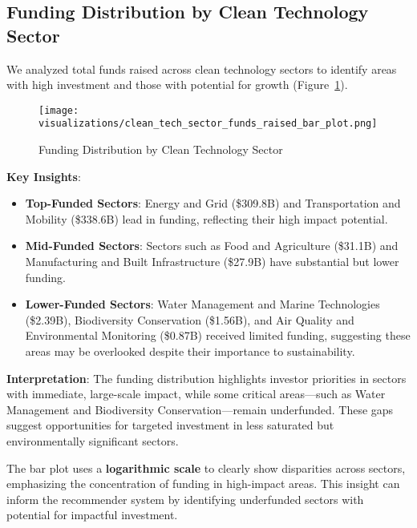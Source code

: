 \documentclass[sigconf]{acmart}
\begin{document}
\subsection{Funding Distribution by Clean Technology Sector}

We analyzed total funds raised across clean technology sectors to identify areas with high investment and those with potential for growth (Figure~\ref{fig:sector_funds_raised}).

\begin{figure}[htpb]
    \centering
    \texttt{[image: visualizations/clean\_tech\_sector\_funds\_raised\_bar\_plot.png]}
    \caption{Funding Distribution by Clean Technology Sector}
    \label{fig:sector_funds_raised}
\end{figure}

\textbf{Key Insights}:

\begin{itemize}
    \item \textbf{Top-Funded Sectors}: Energy and Grid (\$309.8B) and Transportation and Mobility (\$338.6B) lead in funding, reflecting their high impact potential.
    \item \textbf{Mid-Funded Sectors}: Sectors such as Food and Agriculture (\$31.1B) and Manufacturing and Built Infrastructure (\$27.9B) have substantial but lower funding.
    \item \textbf{Lower-Funded Sectors}: Water Management and Marine Technologies (\$2.39B), Biodiversity Conservation (\$1.56B), and Air Quality and Environmental Monitoring (\$0.87B) received limited funding, suggesting these areas may be overlooked despite their importance to sustainability.
\end{itemize}

\textbf{Interpretation}: The funding distribution highlights investor priorities in sectors with immediate, large-scale impact, while some critical areas—such as Water Management and Biodiversity Conservation—remain underfunded. These gaps suggest opportunities for targeted investment in less saturated but environmentally significant sectors.

The bar plot uses a \textbf{logarithmic scale} to clearly show disparities across sectors, emphasizing the concentration of funding in high-impact areas. This insight can inform the recommender system by identifying underfunded sectors with potential for impactful investment.
\end{document}
